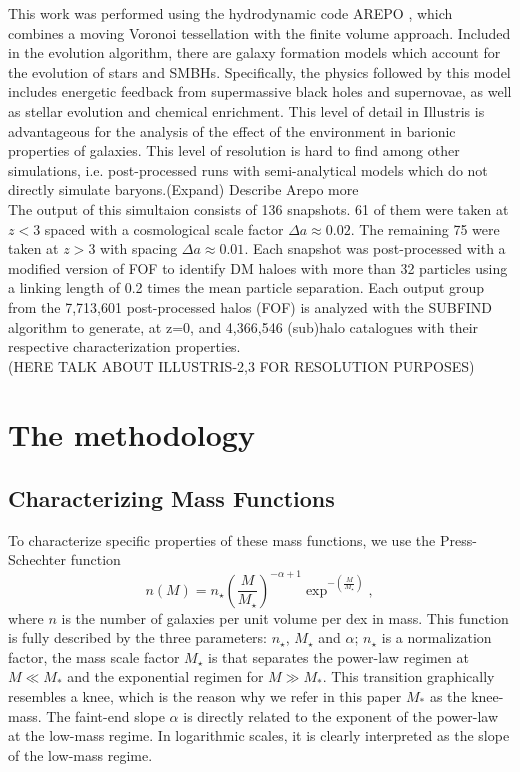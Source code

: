 \documentclass[a4paper,fleqn,usenatbib]{mnras}
\begin{document}
This work was  performed using the hydrodynamic code AREPO
\cite{Arepo}, which combines a moving Voronoi tessellation with the
finite volume approach. Included in the evolution algorithm, there are
galaxy formation models which account for the evolution of stars and
SMBHs. Specifically, the physics followed by this model includes
energetic feedback from supermassive black holes and supernovae, as
well as stellar evolution and chemical enrichment. This level of
detail in Illustris is advantageous for the analysis of the effect of
the environment in barionic properties of galaxies. This level of resolution is hard to find
among other simulations, i.e. post-processed runs with semi-analytical
models which do not directly simulate baryons.(Expand) Describe Arepo more\\ 

The output of this simultaion consists of 136 snapshots. 61 of
them were taken at $z < 3$ spaced with a cosmological scale factor
$\Delta a \approx 0.02$. The remaining 75 were taken at $z > 3$
with spacing $\Delta a \approx 0.01$. Each snapshot was post-processed
with a modified version of FOF \cite{FOF} to identify DM haloes with
more than 32 particles using a linking length of 0.2 times the mean
particle separation. Each output group from the 7,713,601 post-processed halos (FOF) is analyzed with the SUBFIND
algorithm \cite{SUBFIND} to generate, at z=0,
and 4,366,546 (sub)halo catalogues with their respective
characterization properties. \\ 

(HERE TALK ABOUT ILLUSTRIS-2,3 FOR RESOLUTION PURPOSES)

\section{The methodology}

\subsection{ Characterizing Mass Functions}

To characterize specific properties of these mass functions, we use
the Press-Schechter function
\begin{equation}
n(M) = n_\star\left( \frac{M}{M_\star} \right)^{-\alpha+1}\exp^{-\left( \frac{M}{M_\star}\right)},
\label{eq:Schechter}
\end{equation}
%
where $n$ is the number of galaxies per unit volume per dex in mass.
This function is fully described by the three parameters: $n_\star$,
$M_\star$ and $\alpha$; $n_\star$ is a normalization factor, the mass
scale factor $M_\star$ is that separates the power-law regimen at $M
\ll M_*$ and the exponential regimen for $M \gg M_*$. 
This transition graphically resembles a knee, which is the reason why
we refer in this paper $M_*$ as the knee-mass.
The faint-end slope $\alpha$ is directly related to the exponent of the power-law at the low-mass regime.
In logarithmic scales, it is clearly interpreted as the slope of the low-mass regime.\\
\end{document}
